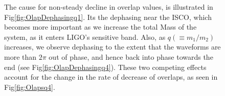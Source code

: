 \documentclass[aps,
prd,
amsmath,
amssymb,
twocolumn,
floatfix,
groupedaddress]{revtex4-1}
\def\l({\left(}
\def\r){\right)}
\begin{document}
\begin{figure}
  \centering
  \caption{The cause for non-steady decline in overlap values, is illustrated in Fig\ref{fig:OlapDephasingq1}. Its the dephasing near the ISCO,  which becomes more important as we increase the total Mass of the system, as it enters LIGO's sensitive band. Also, as $q \l(\equiv m_1/m_2\r)$ increases, we observe dephasing to the extent that the waveforms are more than $2\pi$ out of phase, and hence back into phase towards the end (see Fig\ref{fig:OlapDephasingq4}). These two competing effects account for the change in the rate of decrease of overlaps, as seen in Fig\ref{fig:Olapsq4}.}
  \label{fig:OlapDephasing}
\end{figure}
\end{document}
